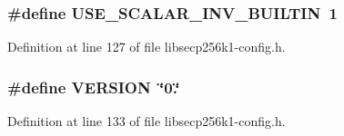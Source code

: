 \subsubsection[{U\+S\+E\+\_\+\+S\+C\+A\+L\+A\+R\+\_\+\+I\+N\+V\+\_\+\+B\+U\+I\+L\+T\+I\+N}]{\setlength{\rightskip}{0pt plus 5cm}\#define U\+S\+E\+\_\+\+S\+C\+A\+L\+A\+R\+\_\+\+I\+N\+V\+\_\+\+B\+U\+I\+L\+T\+I\+N~1}\label{libsecp256k1-config_8h_a827be109fa765a29a66475a1d78bf6b4}


Definition at line 127 of file libsecp256k1-\/config.\+h.

\hypertarget{libsecp256k1-config_8h_a1c6d5de492ac61ad29aec7aa9a436bbf}{}
\subsubsection[{V\+E\+R\+S\+I\+O\+N}]{\setlength{\rightskip}{0pt plus 5cm}\#define V\+E\+R\+S\+I\+O\+N~\char`\"{}0.\char`\"{}}\label{libsecp256k1-config_8h_a1c6d5de492ac61ad29aec7aa9a436bbf}


Definition at line 133 of file libsecp256k1-\/config.\+h.


